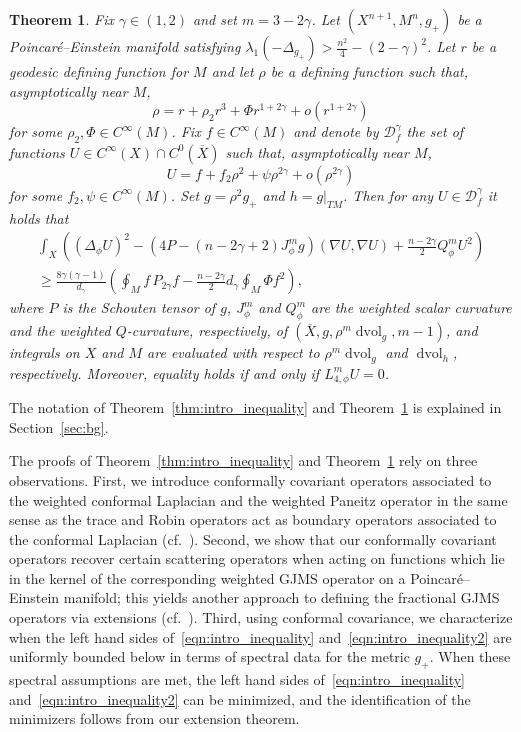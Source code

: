 \documentclass{amsart}
\newtheorem{thm}{Theorem}[section]
\theoremstyle{definition}
\theoremstyle{remark}
\numberwithin{equation}{section}
\begin{document}
\begin{thm}
\label{thm:intro_inequality2}
 Fix $\gamma\in(1,2)$ and set $m=3-2\gamma$.  Let $(X^{n+1},M^n,g_+)$ be a Poincar\'e--Einstein manifold satisfying $\lambda_1(-\Delta_{g_+})>\frac{n^2}{4}-(2-\gamma)^2$.  Let $r$ be a geodesic defining function for $M$ and let $\rho$ be a defining function such that, asymptotically near $M$,
 \[ \rho = r + \rho_2 r^3 + \Phi r^{1+2\gamma} + o(r^{1+2\gamma}) \]
 for some $\rho_2,\Phi\in C^\infty(M)$.  Fix $f\in C^\infty(M)$ and denote by ${\mathcal{D}}_f^\gamma$ the set of functions $U\in C^\infty(X)\cap C^0({\overline{X}})$ such that, asymptotically near $M$,
 \[ U = f + f_2\rho^2 + \psi\rho^{2\gamma} + o(\rho^{2\gamma}) \]
 for some $f_2,\psi\in C^\infty(M)$.  Set $g=\rho^2g_+$ and $h=g{\rvert}_{TM}$.  Then for any $U\in{\mathcal{D}}_f^\gamma$ it holds that
 \begin{multline}
  \label{eqn:intro_inequality2}
  \int_X\left(\left(\Delta_\phi U\right)^2 - \left(4P-(n-2\gamma+2)J_\phi^mg\right)(\nabla U,\nabla U) + \frac{n-2\gamma}{2}Q_\phi^m U^2\right) \\
  \geq \frac{8\gamma(\gamma-1)}{d_\gamma}\left(\oint_M f\,P_{2\gamma}f - \frac{n-2\gamma}{2}d_\gamma\oint_M \Phi f^2\right) ,
 \end{multline}
 where $P$ is the Schouten tensor of $g$, $J_\phi^m$ and $Q_\phi^m$ are the weighted scalar curvature and the weighted $Q$-curvature, respectively, of $({\overline{X}},g,\rho^m\operatorname{dvol}_g,m-1)$, and integrals on $X$ and $M$ are evaluated with respect to $\rho^m\operatorname{dvol}_g$ and $\operatorname{dvol}_h$, respectively.  Moreover, equality holds if and only if $L_{4,\phi}^mU=0$.
\end{thm}

The notation of Theorem~\ref{thm:intro_inequality} and Theorem~\ref{thm:intro_inequality2} is explained in Section~\ref{sec:bg}.

The proofs of Theorem~\ref{thm:intro_inequality} and Theorem~\ref{thm:intro_inequality2} rely on three observations.  First, we introduce conformally covariant operators associated to the weighted conformal Laplacian and the weighted Paneitz operator in the same sense as the trace and Robin operators act as boundary operators associated to the conformal Laplacian (cf.\ \cite{Branson1997,BransonGover2001,Escobar1990,Escobar1992a}).  Second, we show that our conformally covariant operators recover certain scattering operators when acting on functions which lie in the kernel of the corresponding weighted GJMS operator on a Poincar\'e--Einstein manifold; this yields another approach to defining the fractional GJMS operators via extensions (cf.\ \cite{AcheChang2015,CaseChang2013,ChangGonzalez2011,GrahamZworski2003,GuillarmouGuillope2007}).  Third, using conformal covariance, we characterize when the left hand sides of~\eqref{eqn:intro_inequality} and~\eqref{eqn:intro_inequality2} are uniformly bounded below in terms of spectral data for the metric $g_+$.  When these spectral assumptions are met, the left hand sides of~\eqref{eqn:intro_inequality} and~\eqref{eqn:intro_inequality2} can be minimized, and the identification of the minimizers follows from our extension theorem.
\end{document}
